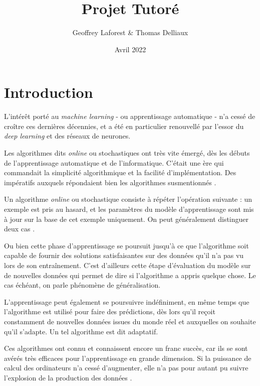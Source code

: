 \documentclass{article}
\title{Projet Tutoré}
\author{Geoffrey Laforest \& Thomas Delliaux} %
\date{Avril 2022}
\begin{document}
\maketitle
\tableofcontents

\section*{Introduction}

L'intérêt porté au \emph{machine learning} - ou apprentissage automatique - n'a cessé de croître ces dernières décennies, et a été en particulier renouvellé par l'essor du \emph{deep learning} et des réseaux de neurones.
\bigskip

Les algorithmes dits \emph{online} ou stochastiques ont très vite émergé, dès les débuts de l'apprentissage automatique et de l'informatique. C'était une ère qui commandait la simplicité algorithmique et la facilité d'implémentation. Des impératifs auxquels répondaient bien les algorithmes susmentionnés \cite{StochasticApproximationAndEfficientLearning}.
\bigskip

Un algorithme \emph{online} ou stochastique consiste à répéter l'opération suivante : un exemple est pris au hasard, et les paramètres du modèle d'apprentissage sont mis à jour sur la base de cet exemple uniquement. On peut généralement distinguer deux cas \cite{bottou-lecun-2004}.
\bigskip

Ou bien cette phase d'apprentissage se poursuit jusqu'à ce que l'algorithme soit capable de fournir des solutions satisfaisantes sur des données qu'il n'a pas vu lors de son entraînement. C'est d'ailleurs cette étape d'évaluation du modèle sur de nouvelles données qui permet de dire si l'algorithme a appris quelque chose. Le cas échéant, on parle phénomène de généralisation.

L'apprentissage peut également se poursuivre indéfiniment, en même temps que l'algorithme est utilisé pour faire des prédictions, dès lors qu'il reçoit \\ constamment de nouvelles données issues du monde réel et auxquelles on souhaite qu'il s'adapte. Un tel algorithme est dit adaptatif.
\bigskip

Ces algorithmes ont connu et connaissent encore un franc succès, car ils se sont avérés très efficaces pour l'apprentissage en grande dimension. Si la puissance de calcul des ordinateurs n'a cessé d'augmenter, elle n'a pas pour autant pu suivre l'explosion de la production des données \cite{Bottou_stochasticgradient_tricks}. 
\bigskip
\end{document}
